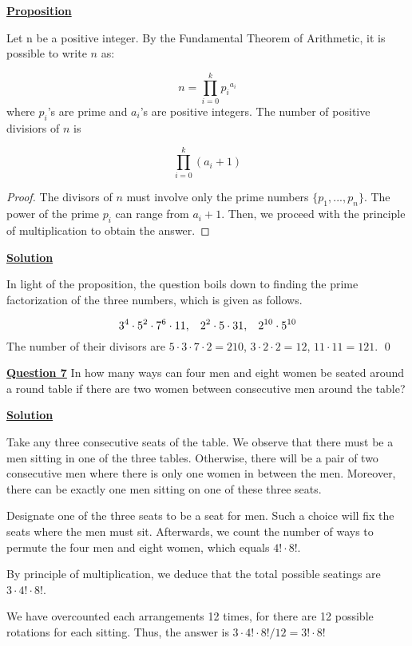 \documentclass{article}
\newcommand{\new}[1]{
    \vspace{2mm}
    \noindent
    \textbf{
    \underline{#1}}
}
\newcommand{\m}{
    \cdot
}
\begin{document}
\new{Proposition} 
Let n be a positive integer. By the Fundamental Theorem of Arithmetic, 
it is possible to write $n$ as:

\[
    n = \prod_{i = 0}^{k} {p_i}^{a_i}
\]
where $p_i$'s are prime and $a_i$'s are positive integers. The number 
of positive divisiors of $n$ is

\begin{equation} \label{eq:numdiv}
    \prod_{i = 0}^{k} (a_i + 1)
\end{equation}

\begin{proof}
    The divisors of $n$ must involve only the prime numbers 
    $\{p_1, ..., p_n\}$. The power of the prime $p_i$ can range 
    from $a_i + 1$. Then, we proceed with the principle of multiplication 
    to obtain the answer.
\end{proof}

\new{Solution} 
In light of the proposition, the question boils down to finding 
the prime factorization of the three numbers, which is given as follows. 

\[
    3^4\cdot5^2\cdot7^6\cdot11,\hspace{3mm} 2^2\cdot5\cdot31, \hspace{3mm} 2^{10}\cdot5^{10}
\]
The number of their divisors are $5\m3\m7\m2 = \boxed{210}$,  $3\m2\m2 = \boxed{12}$,  $11\m11 = \boxed{121}$. \qed

\new{Question 7} In how many ways can four men and eight women be 
seated around a round table if there are two women between consecutive 
men around the table?

\new{Solution} 
Take any three consecutive seats of the table. We observe that there 
must be a men sitting in one of the three tables. Otherwise, there 
will be a pair of two consecutive men where there is only one women 
in between the men. Moreover, there can be exactly one men sitting 
on one of these three seats. 

Designate one of the three seats to be a seat for men. Such a choice 
will fix the seats where the men must sit. Afterwards, we count 
the number of ways to permute the four men and eight women, which 
equals $4!\m8!$. 

By principle of multiplication, we deduce that the total possible 
seatings are $3\m4!\m8!$.

\color{red}
We have overcounted each arrangements 12 times, for there are 12 possible rotations for each sitting. 
Thus, the answer is $\boxed{3\m4!\m8!/12 = 3!\m8!}$
\color{black}
\end{document}
